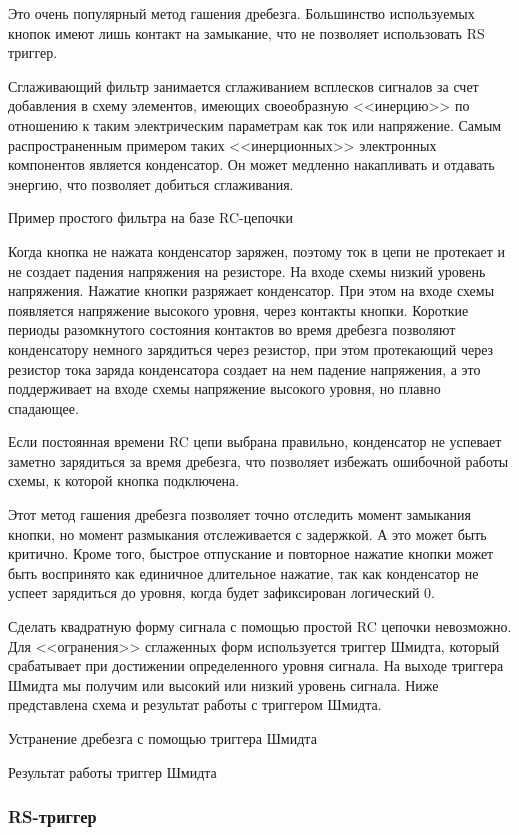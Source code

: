\documentclass{altsu-report}
\begin{document}
Это очень популярный метод гашения дребезга. Большинство используемых кнопок имеют лишь контакт на замыкание, что не позволяет использовать RS триггер.

Сглаживающий фильтр занимается сглаживанием всплесков сигналов за счет добавления в схему элементов, имеющих своеобразную <<инерцию>> по отношению к таким электрическим параметрам как ток или напряжение. Самым распространенным примером таких <<инерционных>> электронных компонентов является конденсатор. Он может медленно накапливать и отдавать энергию, что позволяет добиться сглаживания.

Пример простого фильтра на базе RC-цепочки

Когда кнопка не нажата конденсатор заряжен, поэтому ток в цепи не протекает и не создает падения напряжения на резисторе. На входе схемы низкий уровень напряжения. Нажатие кнопки разряжает конденсатор. При этом на входе схемы появляется напряжение высокого уровня, через контакты кнопки. Короткие периоды разомкнутого состояния контактов во время дребезга позволяют конденсатору немного зарядиться через резистор, при этом протекающий через резистор тока заряда конденсатора создает на нем падение напряжения, а это поддерживает на входе схемы напряжение высокого уровня, но плавно спадающее.

Если постоянная времени RC цепи выбрана правильно, конденсатор не успевает заметно зарядиться за время дребезга, что позволяет избежать ошибочной работы схемы, к которой кнопка подключена.

Этот метод гашения дребезга позволяет точно отследить момент замыкания кнопки, но момент размыкания отслеживается с задержкой. А это может быть критично. Кроме того, быстрое отпускание и повторное нажатие кнопки может быть воспринято как единичное длительное нажатие, так как конденсатор не успеет зарядиться до уровня, когда будет зафиксирован логический 0.

Сделать квадратную форму сигнала с помощью простой RC цепочки невозможно. Для <<огранения>> сглаженных форм используется триггер Шмидта, который срабатывает при достижении определенного уровня сигнала. На выходе триггера Шмидта мы получим или высокий или низкий уровень сигнала. Ниже представлена схема и результат работы с триггером Шмидта.

Устранение дребезга с помощью триггера Шмидта

Результат работы триггер Шмидта

\subsubsection*{RS-триггер}
\end{document}
